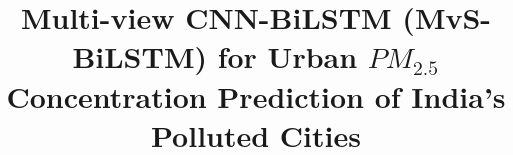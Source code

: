 \documentclass[a4paper, fleqn]{cas-sc}
\theoremstyle{definition}
\theoremstyle{remark}
\begin{document}
\let\WriteBookmarks\relax
\def\floatpagepagefraction{1}
\def\textpagefraction{.001}



\title [mode = title]{Multi-view CNN-BiLSTM (MvS-BiLSTM) for Urban $PM_{2.5}$ Concentration Prediction of India's Polluted Cities}  

\end{document}
